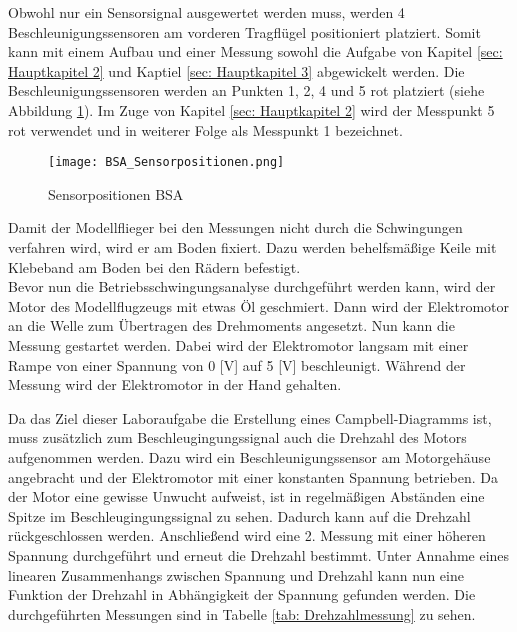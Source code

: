     \noindent
    Obwohl nur ein Sensorsignal ausgewertet werden muss, werden 4
    Beschleunigungssensoren am vorderen Tragflügel positioniert platziert.
    Somit kann mit einem Aufbau und einer Messung sowohl die Aufgabe von Kapitel
    \ref{sec: Hauptkapitel 2} und Kaptiel \ref{sec: Hauptkapitel 3}
    abgewickelt werden. Die Beschleunigungssensoren werden an Punkten 1, 2, 4 und
    5 rot platziert (siehe Abbildung \ref{fig: Sensorpos_BSA}). Im Zuge von
    Kapitel \ref{sec: Hauptkapitel 2} wird der Messpunkt 5 rot verwendet und in
    weiterer Folge als Messpunkt 1 bezeichnet.

    \begin{figure}[H]
        \centering
        \texttt{[image: BSA\_Sensorpositionen.png]}
        \caption{Sensorpositionen BSA}
        \label{fig: Sensorpos_BSA}
    \end{figure}

    \noindent
    Damit der Modellflieger bei den Messungen nicht durch die Schwingungen
    verfahren wird, wird er am Boden fixiert. Dazu werden behelfsmäßige Keile mit
    Klebeband am Boden bei den Rädern befestigt.
    \\

    \noindent
    Bevor nun die Betriebsschwingungsanalyse durchgeführt werden kann, wird der
    Motor des Modellflugzeugs mit etwas Öl geschmiert. Dann wird der Elektromotor
    an die Welle zum Übertragen des Drehmoments angesetzt. Nun kann die Messung
    gestartet werden. Dabei wird der Elektromotor langsam mit einer Rampe von einer
    Spannung von 0 [V] auf 5 [V] beschleunigt. Während der Messung wird der
    Elektromotor in der Hand gehalten.

    \noindent
    Da das Ziel dieser Laboraufgabe die Erstellung eines Campbell-Diagramms ist,
    muss zusätzlich zum Beschleugingungssignal auch die Drehzahl des Motors
    aufgenommen werden. Dazu wird ein Beschleunigungssensor am Motorgehäuse
    angebracht und der Elektromotor mit einer konstanten Spannung betrieben. Da
    der Motor eine gewisse Unwucht aufweist, ist in regelmäßigen Abständen eine
    Spitze im Beschleugingungssignal zu sehen. Dadurch kann auf die Drehzahl
    rückgeschlossen werden. Anschließend wird eine 2. Messung mit einer höheren
    Spannung durchgeführt und erneut die Drehzahl bestimmt. Unter Annahme eines
    linearen Zusammenhangs zwischen Spannung und Drehzahl kann nun eine Funktion
    der Drehzahl in Abhängigkeit der Spannung gefunden werden. Die durchgeführten
    Messungen sind in Tabelle \ref{tab: Drehzahlmessung} zu sehen.

